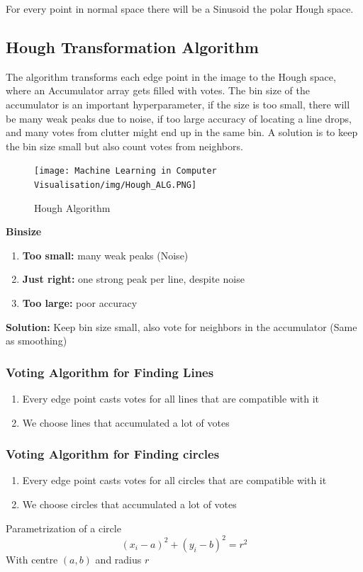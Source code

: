 \documentclass[x11names,11pt,a4paper]{article}
\theoremstyle{definition}
\begin{document}
\noindent For every point in normal space there will be a Sinusoid the polar Hough space.

\subsection{Hough Transformation Algorithm}
The algorithm transforms each edge point in the image to the Hough space, where an Accumulator array gets filled with votes. The bin size of the accumulator is an important hyperparameter, if the size is too small, there will be many weak peaks due to noise, if too large accuracy of locating a line drops, and many votes from clutter might end up in the same bin. A solution is to keep the bin size small but also count votes from neighbors.

\begin{figure}[H]
	\centering
	\texttt{[image: Machine Learning in Computer Visualisation/img/Hough\_ALG.PNG]}
	\caption{Hough Algorithm}
	\label{fig:linerepresentationpolar}
\end{figure}
\textbf{Binsize}
\begin{enumerate}
    \item \textbf{Too small:} many weak peaks (Noise)
    \item \textbf{Just right:} one strong peak per line, despite noise
    \item \textbf{Too large:} poor accuracy
\end{enumerate}

\textbf{Solution:} Keep bin size small, also vote for neighbors in the accumulator (Same as smoothing)

\subsubsection{Voting Algorithm for Finding Lines}
\begin{enumerate}
	\item Every edge point casts votes for all lines that are compatible with it
	\item We choose lines that accumulated a lot of votes
\end{enumerate}


\subsubsection{Voting Algorithm for Finding circles}
\begin{enumerate}
	\item Every edge point casts votes for all circles that are compatible with it
	\item We choose circles that accumulated a lot of votes
\end{enumerate}
\begin{theorem}
	Parametrization of a circle
	\begin{equation*}
		(x_i - a)^2 + (y_i - b)^2 = r^2
	\end{equation*}
	With centre $(a,b)$ and radius $r$
\end{theorem}
\end{document}
